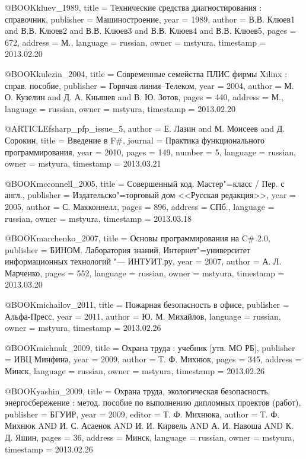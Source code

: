 @BOOK{kluev_1989,
  title = {Технические средства диагностирования : справочник},
  publisher = {Машиностроение},
  year = {1989},
  author = {В.В. Клюев1 and В.В. Клюев2 and В.В. Клюев3 and В.В. Клюев4 and В.В.
	Клюев5},
  pages = {672},
  address = {М.},
  language = {russian},
  owner = {mstyura},
  timestamp = {2013.02.20}
}

@BOOK{kulezin_2004,
  title = {Современные семейства ПЛИС фирмы Xilinx : справ. пособие},
  publisher = {Горячая линия–Телеком},
  year = {2004},
  author = {М. О. Кузелин and Д. А. Кнышев and В. Ю. Зотов},
  pages = {440},
  address = {М.},
  language = {russian},
  owner = {mstyura},
  timestamp = {2013.02.20}
}

@ARTICLE{fsharp_pfp_issue_5,
  author = {Е. Лазин and М. Моисеев and Д. Сорокин},
  title = {Введение в F\#},
  journal = {Практика функционального программирования},
  year = {2010},
  pages = {149},
  number = {5},
  language = {russian},
  owner = {mstyura},
  timestamp = {2013.03.21}
}

@BOOK{mcconnell_2005,
  title = {Совершенный код. Мастер"=класс / Пер. с англ.},
  publisher = {Издательско"=торговый дом <<Русская редакция>>},
  year = {2005},
  author = {С. Макконнелл},
  pages = {896},
  address = {СПб.},
  language = {russian},
  owner = {mstyura},
  timestamp = {2013.03.18}
}

@BOOK{marchenko_2007,
  title = {Основы программирования на C\# 2.0},
  publisher = {БИНОМ. Лаборатория знаний, Интернет"=университет информационных технологий
	"--- ИНТУИТ.ру},
  year = {2007},
  author = {А. Л. Марченко},
  pages = {552},
  language = {russian},
  owner = {mstyura},
  timestamp = {2013.03.20}
}

@BOOK{michailov_2011,
  title = {Пожарная безопасность в офисе},
  publisher = {Альфа-Пресс},
  year = {2011},
  author = {Ю. М. Михайлов},
  language = {russian},
  owner = {mstyura},
  timestamp = {2013.02.26}
}

@BOOK{michnuk_2009,
  title = {Охрана труда : учебник [утв. МО РБ]},
  publisher = {ИВЦ Минфина},
  year = {2009},
  author = {Т. Ф. Михнюк},
  pages = {345},
  address = {Минск},
  language = {russian},
  owner = {mstyura},
  timestamp = {2013.02.26}
}

@BOOK{yashin_2009,
  title = {Охрана труда, экологическая безопасность, энергосбережение : метод.
	пособие по выполнению дипломных проектов (работ)},
  publisher = {БГУИР},
  year = {2009},
  editor = {Т. Ф. Михнюка},
  author = {Т. Ф. Михнюк AND И. С. Асаенок AND И. И. Кирвель AND А. И. Навоша
	AND К. Д. Яшин},
  pages = {36},
  address = {Минск},
  language = {russian},
  owner = {mstyura},
  timestamp = {2013.02.26}
}

